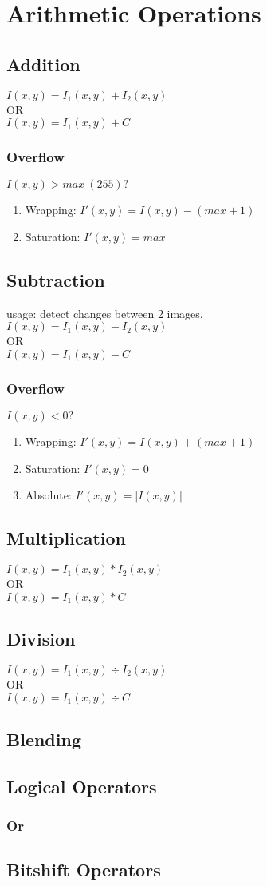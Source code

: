 \section{Arithmetic Operations}
\subsection{Addition}
$I(x,y) = I_1(x,y) + I_2(x,y)$\\
OR\\
$I(x,y) = I_1(x,y) + C$\\
\subsubsection{Overflow}
$I(x,y) > max\ (255)?$
\begin{enumerate}
  \item Wrapping: $I'(x,y) = I(x,y) - (max+1)$
  \item Saturation: $ I'(x,y) = max$
\end{enumerate}

\subsection{Subtraction}
usage: detect changes between 2 images.\\
$I(x,y) = I_1(x,y) - I_2(x,y)$\\
OR\\
$I(x,y) = I_1(x,y) - C$\\
\subsubsection{Overflow}
$I(x,y) < 0?$
\begin{enumerate}
  \item Wrapping: $I'(x,y) = I(x,y) + (max+1)$
  \item Saturation: $ I'(x,y) = 0$
  \item Absolute: $ I'(x,y) = |I(x,y)|$
\end{enumerate}
\subsection{Multiplication}
$I(x,y) = I_1(x,y) * I_2(x,y)$\\
OR\\
$I(x,y) = I_1(x,y) * C$\\
\subsection{Division}
$I(x,y) = I_1(x,y) \div I_2(x,y)$\\
OR\\
$I(x,y) = I_1(x,y) \div C$\\
\subsection{Blending}
\subsection{Logical Operators}
\subsubsection{Or}
\subsection{Bitshift Operators}
